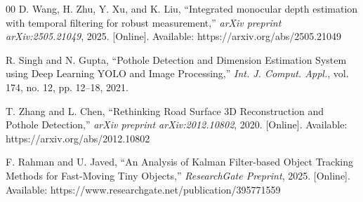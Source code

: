 \documentclass{iopjournal}
\begin{document}
\begin{thebibliography}{00}
D. Wang, H. Zhu, Y. Xu, and K. Liu, ``Integrated monocular depth estimation with temporal filtering for robust measurement,'' \emph{arXiv preprint arXiv:2505.21049}, 2025. [Online]. Available: https://arxiv.org/abs/2505.21049

R. Singh and N. Gupta, ``Pothole Detection and Dimension Estimation System using Deep Learning YOLO and Image Processing,'' \emph{Int. J. Comput. Appl.}, vol. 174, no. 12, pp. 12--18, 2021.

T. Zhang and L. Chen, ``Rethinking Road Surface 3D Reconstruction and Pothole Detection,'' \emph{arXiv preprint arXiv:2012.10802}, 2020. [Online]. Available: https://arxiv.org/abs/2012.10802

F. Rahman and U. Javed, ``An Analysis of Kalman Filter-based Object Tracking Methods for Fast-Moving Tiny Objects,'' \emph{ResearchGate Preprint}, 2025. [Online]. Available: https://www.researchgate.net/publication/395771559

\end{thebibliography}
\end{document}
